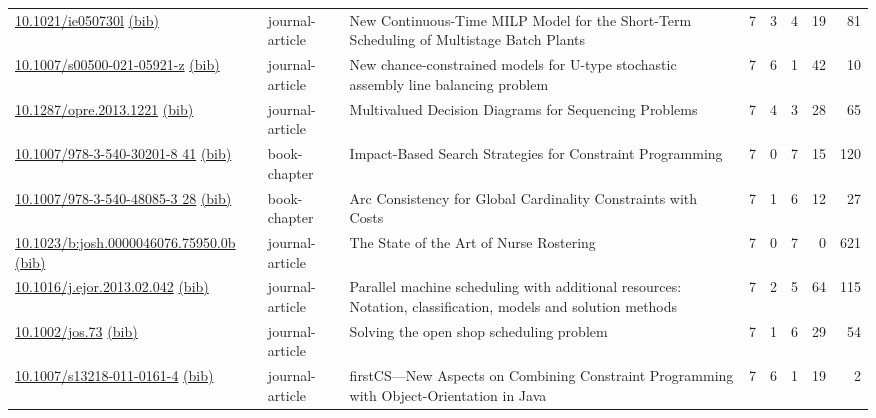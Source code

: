 {\begin{longtable}{p{5cm}lp{11cm}rrrrr}
\href{http://dx.doi.org/10.1021/ie050730l}{10.1021/ie050730l} \href{https://www.doi2bib.org/bib/10.1021/ie050730l}{(bib)} & journal-article & New Continuous-Time MILP Model for the Short-Term Scheduling of Multistage Batch Plants & 7 & 3 & 4 & 19 & 81 \\
\href{http://dx.doi.org/10.1007/s00500-021-05921-z}{10.1007/s00500-021-05921-z} \href{https://www.doi2bib.org/bib/10.1007/s00500-021-05921-z}{(bib)} & journal-article & New chance-constrained models for U-type stochastic assembly line balancing problem & 7 & 6 & 1 & 42 & 10 \\
\href{http://dx.doi.org/10.1287/opre.2013.1221}{10.1287/opre.2013.1221} \href{https://www.doi2bib.org/bib/10.1287/opre.2013.1221}{(bib)} & journal-article & Multivalued Decision Diagrams for Sequencing Problems & 7 & 4 & 3 & 28 & 65 \\
\href{http://dx.doi.org/10.1007/978-3-540-30201-8_41}{10.1007/978-3-540-30201-8 41} \href{https://www.doi2bib.org/bib/10.1007/978-3-540-30201-8_41}{(bib)} & book-chapter & Impact-Based Search Strategies for Constraint Programming & 7 & 0 & 7 & 15 & 120 \\
\href{http://dx.doi.org/10.1007/978-3-540-48085-3_28}{10.1007/978-3-540-48085-3 28} \href{https://www.doi2bib.org/bib/10.1007/978-3-540-48085-3_28}{(bib)} & book-chapter & Arc Consistency for Global Cardinality Constraints with Costs & 7 & 1 & 6 & 12 & 27 \\
\href{http://dx.doi.org/10.1023/b:josh.0000046076.75950.0b}{10.1023/b:josh.0000046076.75950.0b} \href{https://www.doi2bib.org/bib/10.1023/b:josh.0000046076.75950.0b}{(bib)} & journal-article & The State of the Art of Nurse Rostering & 7 & 0 & 7 & 0 & 621 \\
\href{http://dx.doi.org/10.1016/j.ejor.2013.02.042}{10.1016/j.ejor.2013.02.042} \href{https://www.doi2bib.org/bib/10.1016/j.ejor.2013.02.042}{(bib)} & journal-article & Parallel machine scheduling with additional resources: Notation, classification, models and solution methods & 7 & 2 & 5 & 64 & 115 \\
\href{http://dx.doi.org/10.1002/jos.73}{10.1002/jos.73} \href{https://www.doi2bib.org/bib/10.1002/jos.73}{(bib)} & journal-article & Solving the open shop scheduling problem & 7 & 1 & 6 & 29 & 54 \\
\href{http://dx.doi.org/10.1007/s13218-011-0161-4}{10.1007/s13218-011-0161-4} \href{https://www.doi2bib.org/bib/10.1007/s13218-011-0161-4}{(bib)} & journal-article & firstCS—New Aspects on Combining Constraint Programming with Object-Orientation in Java & 7 & 6 & 1 & 19 & 2 \\

\end{longtable}}
